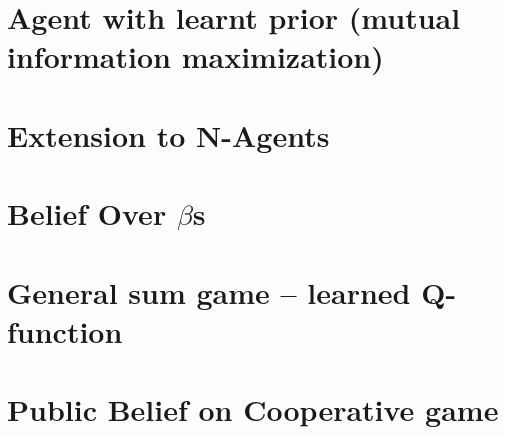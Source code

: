 \section{Agent with learnt prior (mutual information maximization)}

\section{Extension to N-Agents}

\section{Belief Over $\beta$s}

\section{General sum game -- learned Q-function}

\section{Public Belief on Cooperative game}






















